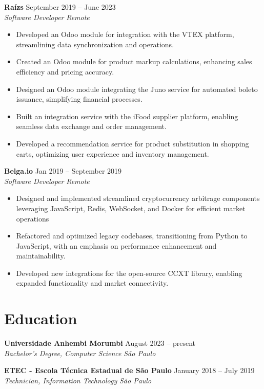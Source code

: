 \documentclass[a4paper,10pt]{article}
\newcommand{\entry}[4]{
  \noindent\textbf{#1} \hfill #2 \\
  \noindent\textit{#3} \hfill \textit{#4} \\
  \vspace{2pt}
}
\begin{document}
\entry{Raízs}{\faCalendar \space September 2019 -- June 2023}{Software Developer}{\faMapMarker \space Remote}
\vspace{-1.6em}
\begin{itemize}
\setlength\itemsep{-0.3em}
\item Developed an Odoo module for integration with the VTEX platform, streamlining data synchronization and operations.
\item Created an Odoo module for product markup calculations, enhancing sales efficiency and pricing accuracy.
\item Designed an Odoo module integrating the Juno service for automated boleto issuance, simplifying financial processes.
\item Built an integration service with the iFood supplier platform, enabling seamless data exchange and order management.
\item Developed a recommendation service for product substitution in shopping carts, optimizing user experience and inventory management.
\end{itemize}

\entry{Belga.io}{\faCalendar \space Jan 2019 -- September 2019}{Software Developer}{\faMapMarker \space Remote}
\vspace{-1.6em}
\begin{itemize}
\setlength\itemsep{-0.3em}
\item Designed and implemented streamlined cryptocurrency arbitrage components leveraging JavaScript, Redis, WebSocket, and Docker for efficient market operations
\item Refactored and optimized legacy codebases, transitioning from Python to JavaScript, with an emphasis on performance enhancement and maintainability.
\item Developed new integrations for the open-source CCXT library, enabling expanded functionality and market connectivity.
\end{itemize}

\section*{Education}
\vspace{0.6em}
\entry{Universidade Anhembi Morumbi}{\faCalendar \space August 2023 -- present}{Bachelor's Degree, Computer Science}{\faMapMarker \space São Paulo}

\vspace{-0.6em}

\entry{ETEC - Escola Técnica Estadual de São Paulo}{\faCalendar \space January 2018 -- July 2019}{Technician, Information Technology}{\faMapMarker \space São Paulo}
\end{document}
